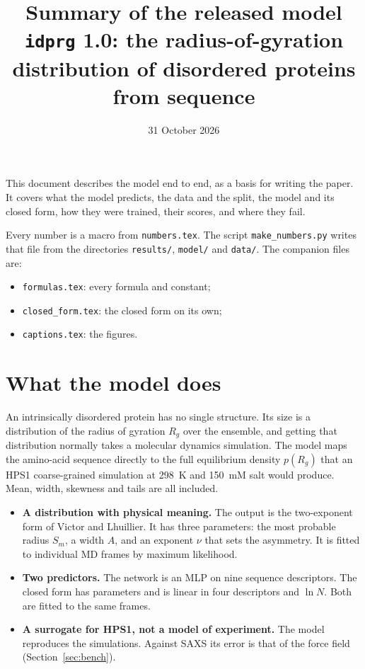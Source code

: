 \documentclass[11pt]{article}
\title{Summary of the released model\\ \large \texttt{idprg} 1.0: the radius-of-gyration distribution of disordered
proteins from sequence}
\date{31 October 2026}
\author{}
\newcommand{\Rg}{R_g}
\begin{document}
\maketitle

\noindent This document describes the model end to end, as a basis for writing the paper. It covers what the model
predicts, the data and the split, the model and its closed form, how they were trained, their scores, and where they
fail.

Every number is a macro from \texttt{numbers.tex}. The script \texttt{make\_numbers.py} writes that file from the
directories \texttt{results/}, \texttt{model/} and \texttt{data/}. The companion files are:
\begin{itemize}
\item \texttt{formulas.tex}: every formula and constant;
\item \texttt{closed\_form.tex}: the closed form on its own;
\item \texttt{captions.tex}: the figures.
\end{itemize}

\tableofcontents

\section{What the model does}
An intrinsically disordered protein has no single structure. Its size is a distribution of the radius of gyration
$\Rg$ over the ensemble, and getting that distribution normally takes a molecular dynamics simulation. The model maps
the amino-acid sequence directly to the full equilibrium density $p(\Rg)$ that an HPS1 coarse-grained simulation at
298~K and 150~mM salt would produce. Mean, width, skewness and tails are all included.

\begin{itemize}
\item \textbf{A distribution with physical meaning.} The output is the two-exponent form of Victor and Lhuillier. It
  has three parameters: the most probable radius $S_m$, a width $A$, and an exponent $\nu$ that sets the asymmetry.
  It is fitted to individual MD frames by maximum likelihood.
\item \textbf{Two predictors.} The network is an MLP on nine sequence descriptors. The closed form has
   parameters and is linear in four descriptors and $\ln N$. Both are fitted to the same frames.
\item \textbf{A surrogate for HPS1, not a model of experiment.} The model reproduces the simulations. Against SAXS its
  error is that of the force field (Section~\ref{sec:bench}).
\end{itemize}
\end{document}
